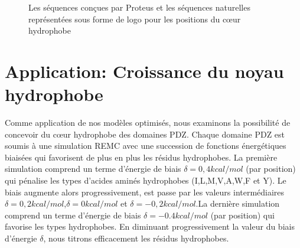    \begin{figure}[t]
     \caption{Les séquences conçues par Proteus et les séquences naturelles représentées sous forme de logo pour les positions du cœur hydrophobe}
\label{logo:corePDZ}
   \end{figure}


    
\section{Application: Croissance du noyau hydrophobe}
Comme application de nos modèles optimisés, nous examinons la possibilité de concevoir du cœur hydrophobe des domaines PDZ. Chaque domaine PDZ est soumis à une simulation REMC avec une succession de fonctions énergétiques biaisées qui favorisent de plus en plus les résidus hydrophobes. La première simulation comprend un terme d'énergie de biais $\delta =0,4 kcal/mol$ (par position) qui pénalise les types d'acides aminés hydrophobes (I,L,M,V,A,W,F et Y). Le biais augmente alors progressivement, est passe par les valeurs intermédiaires $\delta =0,2 kcal/mol$,$\delta =0 kcal/mol$ et  $\delta = -0,2 kcal/mol$.La dernière simulation comprend un terme d'énergie de biais $\delta = -0.4 kcal/mol$ (par position) qui favorise les types hydrophobes. En diminuant progressivement la valeur du biais d'énergie $\delta$, nous \og titrons \fg efficacement les résidus hydrophobes.

